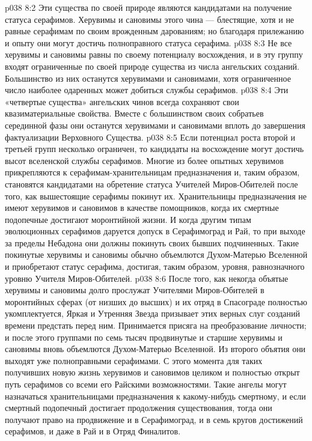 \vs p038 8:2 \pc {}\bibnobreakspace {} Эти существа по своей природе являются кандидатами на получение статуса серафимов. Херувимы и сановимы этого чина --- блестящие, хотя и не равные серафимам по своим врожденным дарованиям; но благодаря прилежанию и опыту они могут достичь полноправного статуса серафима.
\vs p038 8:3 \pc {}\bibnobreakspace {} Не все херувимы и сановимы равны по своему потенциалу восхождения, и в эту группу входят ограниченные по своей природе существа из числа ангельских созданий. Большинство из них останутся херувимами и сановимами, хотя ограниченное число наиболее одаренных может добиться службы серафимов.
\vs p038 8:4 \pc {}\bibnobreakspace {} Эти «четвертые существа» ангельских чинов всегда сохраняют свои квазиматериальные свойства. Вместе с большинством своих собратьев серединной фазы они останутся херувимами и сановимами вплоть до завершения фактуализации Верховного Существа.
\vs p038 8:5 \pc Если потенциал роста второй и третьей групп несколько ограничен, то кандидаты на восхождение могут достичь высот вселенской службы серафимов. Многие из более опытных херувимов прикрепляются к серафимам\hyp{}хранительницам предназначения и, таким образом, становятся кандидатами на обретение статуса Учителей Миров\hyp{}Обителей после того, как вышестоящие серафимы покинут их. Хранительницы предназначения не имеют херувимов и сановимов в качестве помощников, когда их смертные подопечные достигают моронтийной жизни. И когда другим типам эволюционных серафимов даруется допуск в Серафимоград и Рай, то при выходе за пределы Небадона они должны покинуть своих бывших подчиненных. Такие покинутые херувимы и сановимы обычно объемлются Духом\hyp{}Матерью Вселенной и приобретают статус серафима, достигая, таким образом, уровня, равнозначного уровню Учителя Миров\hyp{}Обителей.
\vs p038 8:6 После того, как некогда объятые херувимы и сановимы долго прослужат Учителями Миров\hyp{}Обителей в моронтийных сферах (от низших до высших) и их отряд в Спасограде полностью укомплектуется, Яркая и Утренняя Звезда призывает этих верных слуг созданий времени предстать перед ним. Принимается присяга на преобразование личности; и после этого группами по семь тысяч продвинутые и старшие херувимы и сановимы вновь объемлются Духом\hyp{}Матерью Вселенной. Из второго объятия они выходят уже полноправными серафимами. С этого момента для таких получивших новую жизнь херувимов и сановимов целиком и полностью открыт путь серафимов со всеми его Райскими возможностями. Такие ангелы могут назначаться хранительницами предназначения к какому\hyp{}нибудь смертному, и если смертный подопечный достигает продолжения существования, тогда они получают право на продвижение и в Серафимоград, и в семь кругов достижений серафимов, и даже в Рай и в Отряд Финалитов.
